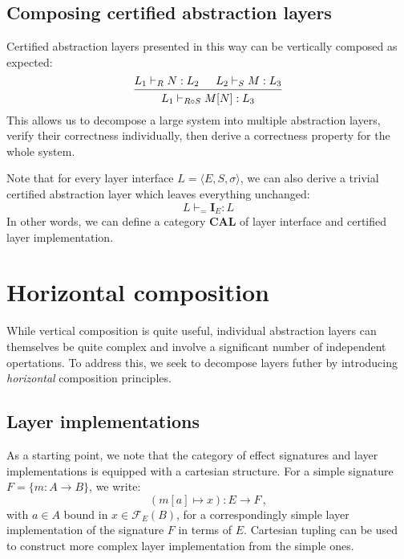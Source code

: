 \documentclass[11pt,oneside,draft]{book}
\theoremstyle{definition}
\begin{document}
\subsection{Composing certified abstraction layers} %

Certified abstraction layers presented in this way
can be vertically composed as expected:
\[
  \begin{prooftree}
    \hypo{L_1 \vdash_R N : L_2}
    \hypo{L_2 \vdash_S M : L_3}
    \infer2{L_1 \vdash_{R \circ S} M[N] : L_3}
  \end{prooftree}
\]
This allows us to decompose a large system
into multiple abstraction layers,
verify their correctness individually,
then derive a correctness property for the whole system.

Note that for every layer interface
$L = \langle E, S, \sigma \rangle$,
we can also derive a trivial certified abstraction layer
which leaves everything unchanged:
\[
  L \vdash_{=} \mathbf{I}_E : L
\]
In other words,
we can define a category $\mathbf{CAL}$
of layer interface and certified layer implementation.



\section{Horizontal composition} %

While vertical composition is quite useful,
individual abstraction layers can themselves be quite complex
and involve a significant number of independent opertations.
To address this,
we seek to decompose layers futher by introducing
\emph{horizontal} composition principles.

\subsection{Layer implementations} %

As a starting point,
we note that the category of effect signatures
and layer implementations
is equipped with a cartesian structure.
For a simple signature $F = \{ m : A \rightarrow B \}$,
we write:
\[ (m[a] \mapsto x) : E \rightarrow F \,, \]
with $a \in A$ bound in $x \in \mathcal{F}_E(B)$,
for a correspondingly simple layer implementation
of the signature $F$ in terms of $E$.
Cartesian tupling can be used to construct more complex
layer implementation from the simple ones.
\end{document}
